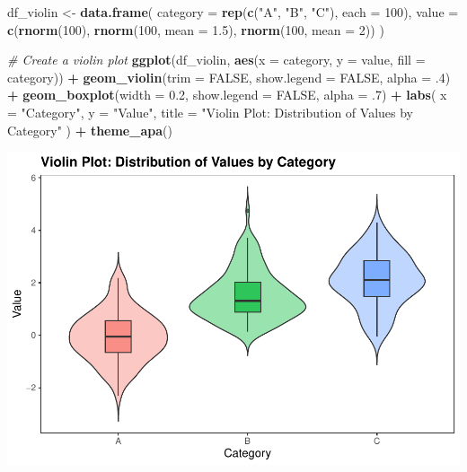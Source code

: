 \documentclass[
]{book}
\newenvironment{Shaded}{\begin{snugshade}}{\end{snugshade}}
\newcommand{\AttributeTok}[1]{\textcolor[rgb]{0.13,0.29,0.53}{#1}}
\newcommand{\CommentTok}[1]{\textcolor[rgb]{0.56,0.35,0.01}{\textit{#1}}}
\newcommand{\ConstantTok}[1]{\textcolor[rgb]{0.56,0.35,0.01}{#1}}
\newcommand{\DecValTok}[1]{\textcolor[rgb]{0.00,0.00,0.81}{#1}}
\newcommand{\FloatTok}[1]{\textcolor[rgb]{0.00,0.00,0.81}{#1}}
\newcommand{\FunctionTok}[1]{\textcolor[rgb]{0.13,0.29,0.53}{\textbf{#1}}}
\newcommand{\NormalTok}[1]{#1}
\newcommand{\OtherTok}[1]{\textcolor[rgb]{0.56,0.35,0.01}{#1}}
\newcommand{\SpecialCharTok}[1]{\textcolor[rgb]{0.81,0.36,0.00}{\textbf{#1}}}
\newcommand{\StringTok}[1]{\textcolor[rgb]{0.31,0.60,0.02}{#1}}
\begin{document}
\begin{Shaded}
\begin{Highlighting}[]
\NormalTok{df\_violin }\OtherTok{\textless{}{-}} \FunctionTok{data.frame}\NormalTok{(}
  \AttributeTok{category =} \FunctionTok{rep}\NormalTok{(}\FunctionTok{c}\NormalTok{(}\StringTok{"A"}\NormalTok{, }\StringTok{"B"}\NormalTok{, }\StringTok{"C"}\NormalTok{), }\AttributeTok{each =} \DecValTok{100}\NormalTok{),}
  \AttributeTok{value =} \FunctionTok{c}\NormalTok{(}\FunctionTok{rnorm}\NormalTok{(}\DecValTok{100}\NormalTok{), }\FunctionTok{rnorm}\NormalTok{(}\DecValTok{100}\NormalTok{, }\AttributeTok{mean =} \FloatTok{1.5}\NormalTok{), }\FunctionTok{rnorm}\NormalTok{(}\DecValTok{100}\NormalTok{, }\AttributeTok{mean =} \DecValTok{2}\NormalTok{))}
\NormalTok{)}

\CommentTok{\# Create a violin plot}
\FunctionTok{ggplot}\NormalTok{(df\_violin, }\FunctionTok{aes}\NormalTok{(}\AttributeTok{x =}\NormalTok{ category, }\AttributeTok{y =}\NormalTok{ value, }\AttributeTok{fill =}\NormalTok{ category)) }\SpecialCharTok{+}
  \FunctionTok{geom\_violin}\NormalTok{(}\AttributeTok{trim =} \ConstantTok{FALSE}\NormalTok{, }
              \AttributeTok{show.legend =} \ConstantTok{FALSE}\NormalTok{, }
              \AttributeTok{alpha =}\NormalTok{ .}\DecValTok{4}\NormalTok{) }\SpecialCharTok{+}
  \FunctionTok{geom\_boxplot}\NormalTok{(}\AttributeTok{width =} \FloatTok{0.2}\NormalTok{, }
               \AttributeTok{show.legend =} \ConstantTok{FALSE}\NormalTok{,}
               \AttributeTok{alpha =}\NormalTok{ .}\DecValTok{7}\NormalTok{) }\SpecialCharTok{+}
  \FunctionTok{labs}\NormalTok{(}
    \AttributeTok{x =} \StringTok{"Category"}\NormalTok{,}
    \AttributeTok{y =} \StringTok{"Value"}\NormalTok{,}
    \AttributeTok{title =} \StringTok{"Violin Plot: Distribution of Values by Category"}
\NormalTok{  ) }\SpecialCharTok{+}
  \FunctionTok{theme\_apa}\NormalTok{()}
\end{Highlighting}
\end{Shaded}

\includegraphics{rintro_demo_files/figure-latex/unnamed-chunk-321-1.pdf}
\end{document}
